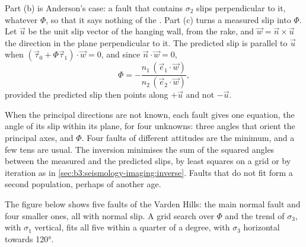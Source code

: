 Part (b) is Anderson's case: a fault that contains $\sigma_2$ slips
perpendicular to it, whatever $\Phi$, so that it says nothing of the . Part (c) turns a measured slip into $\Phi$. Let $\vec u$ be the unit
slip vector of the hanging wall, from the rake, and $\vec w = \vec n\times\vec
u$ the direction in the plane perpendicular to it. The predicted slip is
parallel to $\vec u$ when $(\vec\tau_0 + \Phi\vec\tau_1)\cdot\vec w = 0$, and
since $\vec n\cdot\vec w = 0$,
\[
  \Phi = -\frac{n_1\,(\vec e_1\cdot\vec w)}{n_2\,(\vec e_2\cdot\vec w)} ,
\]
provided the predicted slip then points along $+\vec u$ and not $-\vec u$.

When the principal directions are not known, each fault gives one equation,
the angle of its slip within its plane, for four unknowns: three angles that
orient the principal axes, and $\Phi$. Four faults of different attitudes are
the minimum, and a few tens are usual. The inversion minimises the sum of the
squared angles between the measured and the predicted slips, by least squares
on a grid or by iteration as in \cref{sec:b3:seismology-imaging:inverse}.
Faults that do not fit form a second population, perhaps of another age.

The figure below shows five faults of the Varden Hills: the main normal fault
and four smaller ones, all with normal slip. A grid search over $\Phi$ and the
trend of $\sigma_3$, with $\sigma_1$ vertical, fits all five within a quarter
of a degree, with $\sigma_3$ horizontal towards \ang{120}.

